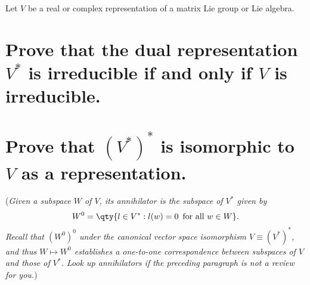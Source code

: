 \documentclass[
	pages,
	boxes,
	color=WildStrawberry
]{homework}
\begin{document}
\begin{solution}

\end{solution}

\begin{problem}
Let $V$ be a real or complex representation of a matrix Lie group or Lie algebra.
\begin{parts}
	\part{Prove that the dual representation $V^*$ is irreducible if and only if $V$ is irreducible.}\label{part:3a}
	\part{Prove that $(V^*)^*$ is isomorphic to $V$ as a representation.}\label{part:3b}

	(\textit{Given a subspace $W$ of $V$, its annihilator is the subspace of $V^*$ given by
		\[
			W^{0}= \qty{l \in V^* : l(w) = 0 \,\text{ for all }w \in W}.
		\]
		Recall that $(W^{0})^{0}$ under the canonical vector space isomorphism $V \equiv (V^*)^*$, and thus $W \mapsto W^{0}$ establishes a one-to-one correspondence between subspaces of $V$ and those of $V^*$. Look up annihilators if the preceding paragraph is not a review for you.})
\end{parts}
\end{problem}
\end{document}
